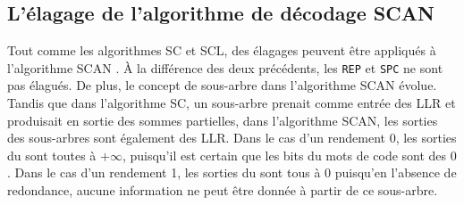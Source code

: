 
\subsection{L'élagage de l'algorithme de décodage SCAN}
Tout comme les algorithmes SC et SCL, des élagages peuvent être appliqués à l'algorithme SCAN \cite{lin_reduced_2015}. \`A la différence des deux précédents, les \noeuds \texttt{REP} et \texttt{SPC} ne sont pas élagués. De plus, le concept de sous-arbre dans l'algorithme SCAN évolue. Tandis que dans l'algorithme SC, un sous-arbre prenait comme entrée des LLR et produisait en sortie des sommes partielles, dans l'algorithme SCAN, les sorties des sous-arbres sont également des LLR. Dans le cas d'un rendement 0, les sorties du \noeud sont toutes à $+\infty$, puisqu'il est certain que les bits du mots de code sont des $0$. Dans le cas d'un rendement 1, les sorties du \noeud sont tous à $0$ puisqu'en l'absence de redondance, aucune information ne peut être donnée à partir de ce sous-arbre.




